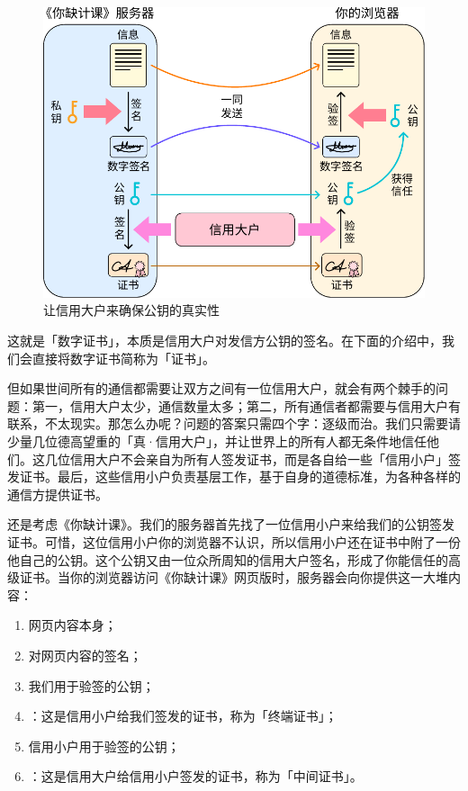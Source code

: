 \begin{figure}[htb!]
  \centering
  \includegraphics[width=.7\textwidth]{assets/surpass/Signing_with_CA.pdf}
  \caption{让信用大户来确保公钥的真实性}
  \label{fig:Signing_with_CA}
\end{figure}

这就是「数字证书」，本质是信用大户对发信方公钥的签名。在下面的介绍中，我们会直接将数字证书简称为「证书」。

但如果世间所有的通信都需要让双方之间有一位信用大户，就会有两个棘手的问题：第一，信用大户太少，通信数量太多；第二，所有通信者都需要与信用大户有联系，不太现实。那怎么办呢？问题的答案只需四个字：逐级而治。我们只需要请少量几位德高望重的「真·信用大户」，并让世界上的所有人都无条件地信任他们。这几位信用大户不会亲自为所有人签发证书，而是各自给一些「信用小户」签发证书。最后，这些信用小户负责基层工作，基于自身的道德标准，为各种各样的通信方提供证书。

还是考虑《你缺计课》。我们的服务器首先找了一位信用小户来给我们的公钥签发证书。可惜，这位信用小户你的浏览器不认识，所以信用小户还在证书中附了一份他自己的公钥。这个公钥又由一位众所周知的信用大户签名，形成了你能信任的高级证书。当你的浏览器访问《你缺计课》网页版时，服务器会向你提供这一大堆内容：

\begin{enumerate}
  \item 网页内容本身；
  \item 对网页内容的签名；
  \item 我们用于验签的公钥；
  \item {}：这是信用小户给我们签发的证书，称为「终端证书」；
  \item 信用小户用于验签的公钥；
  \item {}：这是信用大户给信用小户签发的证书，称为「中间证书」。
\end{enumerate}

